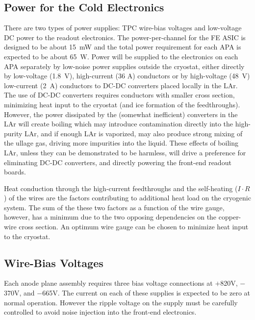 %
\subsection{Power for the Cold Electronics }
\label{subsec:ce_feedthrough_power}

There are two types of power supplies:
TPC wire-bias voltages and low-voltage DC power to the readout electronics.
The power-per-channel for the FE ASIC is designed to be about 15~mW and
the total power requirement for each APA is expected to be about 65~W.
Power will be supplied to the electronics on each APA separately by low-noise
power supplies outside the cryostat, either directly by
low-voltage (1.8~V), high-current (36 A) conductors or by high-voltage (48~V)
low-current (2~A) conductors to DC-DC converters placed locally in the LAr.
The use of DC-DC converters requires conductors with smaller cross section,
minimizing heat input to the cryostat (and ice formation of the feedthroughs).
However, the power dissipated by the (somewhat inefficient) converters in
the LAr will create boiling which may introduce contamination directly into the 
high-purity LAr, and if enough LAr is vaporized, may also produce strong mixing of the
ullage gas, driving more impurities into the liquid.
These effects of boiling LAr, unless they can be demonstrated to be harmless,
will drive a preference for eliminating DC-DC converters, and directly powering the front-end readout boards.

Heat conduction through the high-current feedthroughs and the self-heating ($I\cdot R$) of the wires are the factors
contributing to additional heat load on the cryogenic system.
The sum of the these two factors as a function of the wire gauge, however, has a minimum 
due to the two opposing dependencies on the copper-wire cross section.
An optimum wire gauge can be chosen to minimize heat input to the cryostat.

%
\subsection{Wire-Bias Voltages}
\label{subsec:ce_feedthrough_wirebias}

Each anode plane assembly requires three bias voltage connections 
at $+$820V, $-$370V, and $-$665V.
The current on each of these supplies is expected to be zero at normal operation.
However the ripple voltage on the supply must be carefully controlled 
to avoid noise injection into the front-end electronics.  

